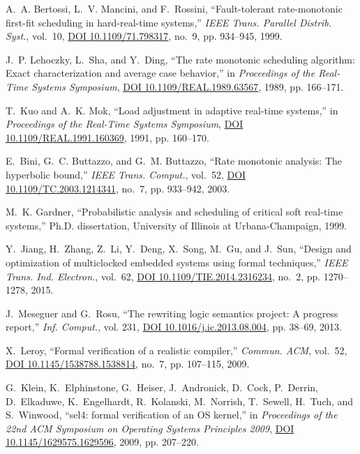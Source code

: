 \documentclass[12pt,onecolumn]{IEEEtranTIE}
\begin{document}
\begin{thebibliography}{10}
A.~A. Bertossi, L.~V. Mancini, and F.~Rossini, ``Fault-tolerant rate-monotonic
  first-fit scheduling in hard-real-time systems,'' \emph{{IEEE} Trans.
  Parallel Distrib. Syst.}, vol.~10,
  \href{http://dx.doi.org/10.1109/71.798317}{DOI 10.1109/71.798317}, no.~9, pp.
  934--945, 1999.

J.~P. Lehoczky, L.~Sha, and Y.~Ding, ``The rate monotonic scheduling algorithm:
  Exact characterization and average case behavior,'' in \emph{Proceedings of
  the Real-Time Systems Symposium},
  \href{http://dx.doi.org/10.1109/REAL.1989.63567}{DOI
  10.1109/REAL.1989.63567}, 1989, pp. 166--171.

T.~Kuo and A.~K. Mok, ``Load adjustment in adaptive real-time systems,'' in
  \emph{Proceedings of the Real-Time Systems Symposium},
  \href{http://dx.doi.org/10.1109/REAL.1991.160369}{DOI
  10.1109/REAL.1991.160369}, 1991, pp. 160--170.

E.~Bini, G.~C. Buttazzo, and G.~M. Buttazzo, ``Rate monotonic analysis: The
  hyperbolic bound,'' \emph{{IEEE} Trans. Comput.}, vol.~52,
  \href{http://dx.doi.org/10.1109/TC.2003.1214341}{DOI
  10.1109/TC.2003.1214341}, no.~7, pp. 933--942, 2003.

M.~K. Gardner, ``Probabilistic analysis and scheduling of critical soft
  real-time systems,'' Ph.D. dissertation, University of Illinois at
  Urbana-Champaign, 1999.

Y.~Jiang, H.~Zhang, Z.~Li, Y.~Deng, X.~Song, M.~Gu, and J.~Sun, ``Design and
  optimization of multiclocked embedded systems using formal techniques,''
  \emph{{IEEE} Trans. Ind. Electron.}, vol.~62,
  \href{http://dx.doi.org/10.1109/TIE.2014.2316234}{DOI
  10.1109/TIE.2014.2316234}, no.~2, pp. 1270--1278, 2015.

J.~Meseguer and G.~Rosu, ``The rewriting logic semantics project: A progress
  report,'' \emph{Inf. Comput.}, vol. 231,
  \href{http://dx.doi.org/10.1016/j.ic.2013.08.004}{DOI
  10.1016/j.ic.2013.08.004}, pp. 38--69, 2013.

X.~Leroy, ``Formal verification of a realistic compiler,'' \emph{Commun.
  {ACM}}, vol.~52, \href{http://dx.doi.org/10.1145/1538788.1538814}{DOI
  10.1145/1538788.1538814}, no.~7, pp. 107--115, 2009.

G.~Klein, K.~Elphinstone, G.~Heiser, J.~Andronick, D.~Cock, P.~Derrin,
  D.~Elkaduwe, K.~Engelhardt, R.~Kolanski, M.~Norrish, T.~Sewell, H.~Tuch, and
  S.~Winwood, ``sel4: formal verification of an {OS} kernel,'' in
  \emph{Proceedings of the 22nd {ACM} Symposium on Operating Systems Principles
  2009}, \href{http://dx.doi.org/10.1145/1629575.1629596}{DOI
  10.1145/1629575.1629596}, 2009, pp. 207--220.


\end{thebibliography}
\end{document}
